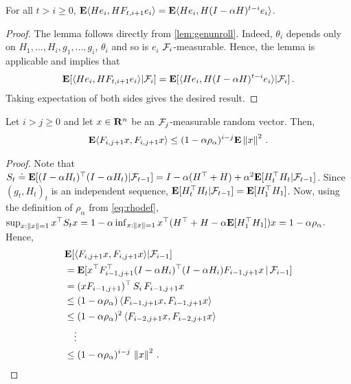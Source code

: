 \begin{lemma}\label{lem:unroll}
For all $t>i\ge 0$, $\mathbf{E} \langle He_i,H F_{t,i+1} e_i\rangle=\mathbf{E}\langle He_i,H(I-\alpha H)^{t-i} e_i\rangle$.
\end{lemma}
\begin{proof}
The lemma follows directly from \cref{lem:genunroll}. Indeed,
$\theta_i$ depends only on $H_1,\dots,H_{i},g_1,\dots,g_{i}$, $\theta_i$ and so is $e_i$ $\mathcal{F}_i$-measurable.
Hence, the lemma is applicable and implies that
\begin{align*}
\mathbf{E}[ \langle He_i, HF_{t,i+1} e_i\rangle | \mathcal{F}_i ] =
\mathbf{E}[ \langle He_i, H (I-\alpha H)^{t-i} e_i\rangle | \mathcal{F}_i ]\,.
\end{align*}
Taking expectation of both sides gives the desired result.
\end{proof}

\begin{lemma}\label{innerproduct}
Let $i>j \ge 0$ and let $x\in \mathbf{R}^n$ be an $\mathcal{F}_j$-measurable random vector.
Then,
\begin{align*}
\mathbf{E}\langle F_{i,j+1}x,F_{i,j+1}x\rangle\leq (1-\alpha \rho_\alpha)^{i-j}\mathbf{E}\left\| x\right\|^2\,.
\end{align*}
\end{lemma}
\begin{proof}
Note that
$S_t\doteq \mathbf{E}[ (I-\alpha H_t)^\top (I-\alpha H_t) | \mathcal{F}_{t-1} ]
= I - \alpha (H^\top + H) + \alpha^2 \mathbf{E}[ H_t^\top H_t | \mathcal{F}_{t-1} ]$.
Since $(g_t,H_t)_t$ is an independent sequence, $\mathbf{E}[ H_t^\top H_t|\mathcal{F}_{t-1}] = \mathbf{E}[ H_1^\top H_1 ]$.
Now, using the definition of $\rho_\alpha$ from \eqref{eq:rhodef},
$\sup_{x:\left\| x\right\|= 1} x^\top S_t x = 1 - \alpha \inf_{x:\left\| x\right\|=1} x^\top (H^\top + H - \alpha \mathbf{E}[H_1^\top H_1]) x
= 1-\alpha \rho_\alpha$.
Hence,
\begin{align*}
&\mathbf{E}[\langle F_{i,j+1}x,F_{i,j+1}x\rangle|\mathcal{F}_{i-1} ]\\
&= \mathbf{E}[x^\top F_{i-1,j+1}^\top (I-\alpha H_i)^\top (I-\alpha H_i) F_{i-1,j+1} x\,|\,\mathcal{F}_{i-1}]\\
&=(x F_{i-1,j+1})^\top \, S_i \, F_{i-1,j+1} x\\
&\le (1-\alpha \rho_\alpha) \, \langle F_{i-1,j+1} x, F_{i-1,j+1} x\rangle \\
& \le (1-\alpha \rho_\alpha)^2\, \langle F_{i-2,j+1} x, F_{i-2,j+1} x\rangle \\
& \quad \vdots \\
& \le (1-\alpha \rho_\alpha)^{i-j}\, \left\| x\right\|^2\,.
\end{align*}
\end{proof}

